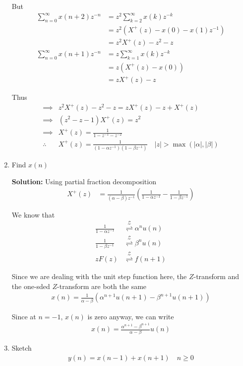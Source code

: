 \documentclass[journal,12pt,twocolumn]{IEEEtran}
\newcommand{\solution}{\noindent \textbf{Solution: }}
\providecommand{\brak}[1]{\ensuremath{\left(#1\right)}}
\providecommand{\abs}[1]{\left\vert#1\right\vert}
\providecommand{\ztrans}{\overset{\mathcal{Z}}{ \rightleftharpoons}}
\numberwithin{equation}{section}
\renewcommand\thesection{\arabic{section}}
\begin{document}
\begin{enumerate}[label=\thesection.\arabic*,ref=\thesection.\theenumi]
But
\begin{align}
	\sum_{n=0}^\infty x(n+2)z^{-n} &= z^2 \sum_{k=2}^\infty x(k) z^{-k} \\
	&= z^2 \brak{X^+(z) - x(0) - x(1) z^{-1}} \\
	&= z^2 X^+(z) - z^2 - z \\
	\sum_{n=0}^\infty x(n+1)z^{-n} &= z \sum_{k=1}^\infty x(k) z^{-k} \\
	&= z \brak{X^+(z) - x(0)} \\
	&= z X^+(z) - z
\end{align}

Thus
\begin{align}
    \implies&z^2X^+(z) - z^2 - z = zX^+(z) - z + X^+(z) \\
    \implies&\brak{z^2 - z - 1}X^+(z) = z^2 \\
    \implies&X^+(z) = \frac{1}{1 - z^{-1} - z^{-2}} \\
    \therefore&X^+(z) = \frac{1}{\brak{1 - \alpha z^{-1}}\brak{1 - \beta z^{-1}}} \quad |z| > \max\brak{\abs{\alpha}, \abs{\beta}}
\end{align}

\item Find $x(n)$

\solution Using partial fraction decomposition
\begin{align}
	X^+(z) &= \frac{1}{\brak{\alpha - \beta}z^{-1}}\brak{\frac{1}{1 - \alpha z^{-1}} - \frac{1}{1 - \beta z^{-1}}}
\end{align}

We know that
\begin{align}
	\frac{1}{1 - \alpha z^{-1}} &\ztrans \alpha^n u(n) \\
	\frac{1}{1 - \beta z^{-1}} &\ztrans \beta^n u(n) \\
	zF(z) &\ztrans f(n+1)
\end{align}

Since we are dealing with the unit step function here, the $Z$-transform and the one-sded $Z$-transform are both the same
\begin{align}
	x(n) = \frac{1}{\alpha - \beta}  \brak{\alpha^{n+1} u(n+1) - \beta^{n+1} u(n+1)}
\end{align}

Since at $n=-1$, $x(n)$ is zero anyway, we can write
\begin{align}
	x(n) = \frac{\alpha^{n+1} - \beta^{n+1}}{\alpha - \beta} u(n)
\end{align}

	\item Sketch 
\begin{align}
	y(n) = x\brak{n-1} + x\brak{n+1}  \quad n \ge 0
	\label{eq:10-orig-diff-rev}
\end{align}


\end{enumerate}
\end{document}
